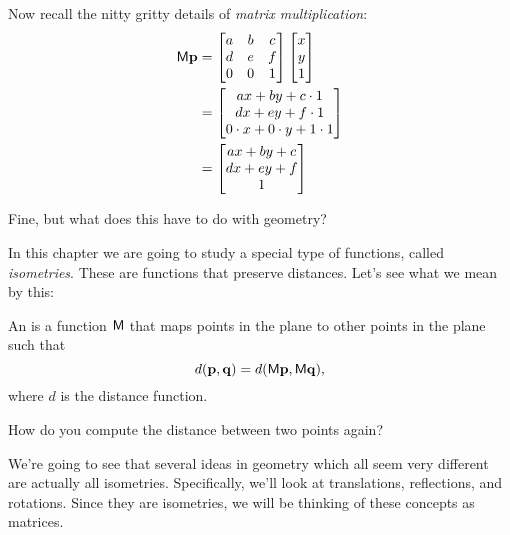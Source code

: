 \documentclass{ximera}
\begin{document}
Now recall the nitty gritty details of \textit{matrix
  multiplication}:
\begin{align*}
\mathsf{M} \mathbf{p} &= 
\begin{bmatrix}
a & b & c \\ 
d & e & f \\
0 & 0 & 1
\end{bmatrix}
\begin{bmatrix}
x \\
y \\
1
\end{bmatrix} \\
&= \begin{bmatrix}
ax + by + c\cdot 1\\
dx + ey + f\cdot 1\\
0\cdot x + 0 \cdot y  + 1\cdot 1
\end{bmatrix}\\
&= \begin{bmatrix}
ax + by + c\\ 
dx + ey + f\\
1
\end{bmatrix}
\end{align*}

\begin{question} Fine, but what does this have to do with geometry?
\begin{center}
\end{center}
\end{question}

In this chapter we are going to study a special type of functions,
called \textit{isometries}. These are functions that preserve
distances. Let's see what we mean by this:

\begin{definition} 
An  is a function $\mathsf{M}$ that maps points in the
plane to other points in the plane such that
\[
d(\mathbf{p}, \mathbf{q}) = d(\mathsf{M} \mathbf{p},\mathsf{M}\mathbf{q}),
\]
where $d$ is the distance function.
\end{definition}


\begin{question}
  How do you compute the distance between two points again?
  \begin{multipleChoice}
  \end{multipleChoice}
\end{question}


We're going to see that several ideas in geometry which all seem very different are actually all isometries.  Specifically, we'll look at
translations, reflections, and rotations.  Since they are isometries, 
we will be thinking of these concepts as matrices.
\end{document}
